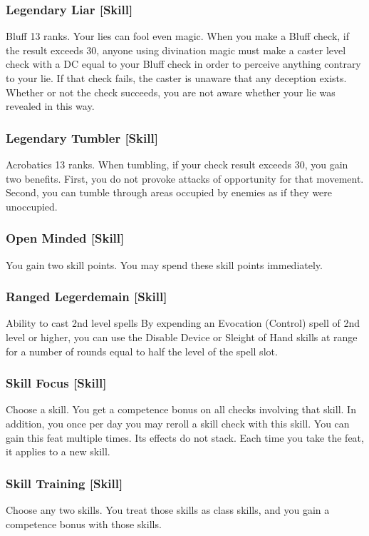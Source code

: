 \subsubsection{Legendary Liar [Skill]}
\featpre Bluff 13 ranks.
\featben Your lies can fool even magic. When you make a Bluff check, if the result exceeds 30, anyone using divination magic must make a caster level check with a DC equal to your Bluff check in order to perceive anything contrary to your lie. If that check fails, the caster is unaware that any deception exists. Whether or not the check succeeds, you are not aware whether your lie was revealed in this way.

\subsubsection{Legendary Tumbler [Skill]}
\featpre Acrobatics 13 ranks.
\featben When tumbling, if your check result exceeds 30, you gain two benefits. First, you do not provoke attacks of opportunity for that movement. Second, you can tumble through areas occupied by enemies as if they were unoccupied.

\subsubsection{Open Minded [Skill]}
 You gain two skill points. You may spend these skill points immediately.

\subsubsection{Ranged Legerdemain [Skill]}
 Ability to cast 2nd level spells
 By expending an Evocation (Control) spell of 2nd level or higher, you can use the Disable Device or Sleight of Hand skills at \rngclose range for a number of rounds equal to half the level of the spell slot.

\subsubsection{Skill Focus [Skill]}
Choose a skill.
 You get a  competence bonus on all checks involving that skill. In addition, you once per day you may reroll a skill check with this skill.
 You can gain this feat multiple times. Its effects do not stack. Each time you take the feat, it applies to a new skill.

\subsubsection{Skill Training [Skill]}
\featben Choose any two skills. You treat those skills as class skills, and you gain a  competence bonus with those skills.

